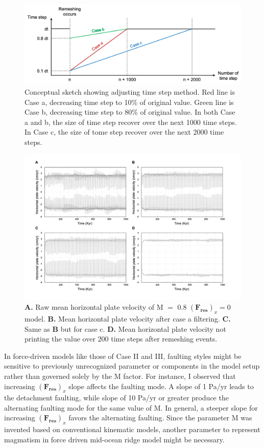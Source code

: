 \documentclass[letterpaper,12pt,notitle]{memphisthesis}                     %
\begin{document}
\begin{figure}[!htb]
	\centering
	\includegraphics[width=0.8\linewidth]{./figs/dtadjust.png}
	\caption{Conceptual sketch showing adjusting time step method. Red line is Case a, decreasing time step to 10\% of original value. Green line is Case b, decreasing time step to 80\% of original value. In both Case a and b, the size of time step recover over the next 1000 time steps. In Case c, the size of tome step recover over the next 2000 time steps.}
	\label{fig:dtadj}
\end{figure}
%
\begin{figure}[!htb]
	\centering
	\includegraphics[width=0.98\linewidth,trim=4 4 4 4,clip]{./figs/remeshing.png}
	\caption{\textbf{A.} Raw mean horizontal plate velocity of M $=$ 0.8 $(\boldsymbol{F_{res}})_x = 0$ model. \textbf{B.} Mean horizontal plate velocity after case a filtering. \textbf{C.} Same as \textbf{B} but for case c. \textbf{D.} Mean horizontal plate velocity not printing the value over 200 time steps after remeshing events.}
	\label{fig:remeshing}
\end{figure}

In force-driven models like those of Case II and III, faulting styles might be sensitive to previously unrecognized parameter or components in the model setup rather than governed solely by the M factor. For instance, I observed that increasing $(\boldsymbol{F_{res}})_x$ slope affects the faulting mode. A slope of 1 Pa/yr leads to the detachment faulting, while slope of 10 Pa/yr or greater produce the alternating faulting mode for the same value of M. In general, a steeper slope for increasing $(\boldsymbol{F_{res}})_x$ favors the alternating faulting. Since the parameter M was invented based on conventional kinematic models, another parameter to represent magmatism in force driven mid-ocean ridge model might be necessary.
\end{document}
